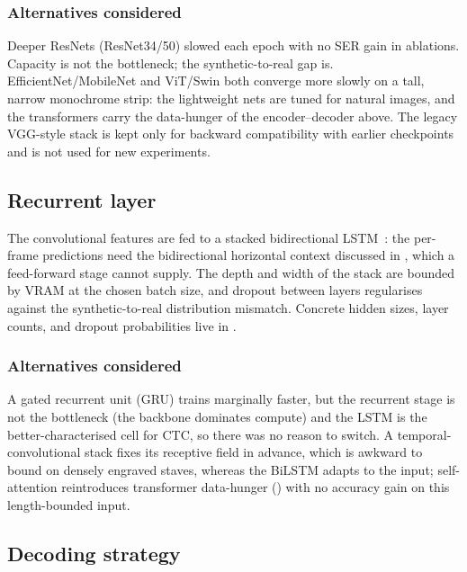 \subsubsection*{Alternatives considered}

Deeper ResNets (ResNet34/50) slowed each epoch with no SER gain in
ablations. Capacity is not the bottleneck; the synthetic-to-real
gap is. EfficientNet/MobileNet and ViT/Swin both converge more slowly
on a tall, narrow monochrome strip: the lightweight nets are tuned for
natural images, and the transformers carry the data-hunger of the
encoder--decoder above. The legacy VGG-style stack is kept only for
backward compatibility with earlier checkpoints and is not used for
new experiments.

\subsection{Recurrent layer}

The convolutional features are fed to a stacked bidirectional
LSTM~\cite{hochreiterLongShortTermMemory1997}: the per-frame
predictions need the bidirectional horizontal context discussed in
, which a feed-forward stage cannot supply.
The depth and width of the stack are bounded by VRAM at the chosen
batch size, and dropout between layers regularises against the
synthetic-to-real distribution mismatch.
Concrete hidden sizes, layer counts, and dropout probabilities live
in .

\subsubsection*{Alternatives considered}

A gated recurrent unit (GRU) trains marginally faster, but the recurrent stage is not the
bottleneck (the backbone dominates compute) and the LSTM is the
better-characterised cell for CTC, so there was no reason to switch.
A temporal-convolutional stack fixes its receptive field in advance,
which is awkward to bound on densely engraved staves, whereas the BiLSTM
adapts to the input; self-attention reintroduces transformer data-hunger
() with no accuracy gain on this
length-bounded input.

\subsection{Decoding strategy}
\label{sec:design-decoder}


